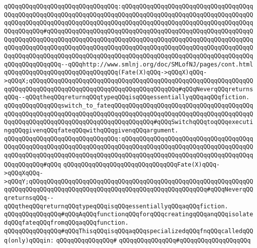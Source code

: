 \verb|qQQqqQQqqQQqqQQqqQQqqQQqqQQqqQQq:qQQqqQQqqQQqqQQqqQQqqQQqqQQqqQQqqQQqqQQqqQQqqQQqqQQqqQQqqQQqqQQqqQQqqQQqqQQqqQQqqQQqqQQqqQQqqQQqqQQqqQQqqQQqqQQqqQQqqQQqqQQqqQQqqQQqqQQqqQQqqQQqqQQqqQQqqQQqqQQqqQQqqQQqqQQqqQQqqQQqqQQqqQQq#qQQqqQQqqQQqqQQqqQQqqQQqqQQqqQQqqQQqqQQqqQQqqQQqqQQqqQQqqQQqqQQqqQQqqQQqqQQqqQQqqQQqqQQqqQQqqQQqqQQqqQQqqQQqqQQqqQQqqQQqqQQqqQQqqQQqqQQqqQQqqQQqqQQqqQQqqQQqqQQqqQQqqQQqqQQqqQQqqQQqqQQqqQQqqQQqqQQqqQQqqQQqqQQqqQQqqQQqqQQqqQQqqQQqqQQqqQQqqQQqqQQqqQQqqQQqqQQqqQQqqQQqqQQqqQQqqQQqqQQqqQQq--qQQqhttp://www.smlnj.org/doc/SMLofNJ/pages/cont.html|\newline
\verb|qQQqqQQqqQQqqQQqqQQqqQQqqQQqqQQq(Fate(X)qQQq->qQQqX)qQQq->qQQqX;qQQqqQQqqQQqqQQqqQQqqQQqqQQqqQQqqQQqqQQqqQQqqQQqqQQqqQQqqQQqqQQqqQQqqQQqqQQqqQQqqQQqqQQqqQQqqQQqqQQqqQQqqQQqqQQq#qQQqNeverqQQqreturnsqQQq--qQQqtheqQQqreturnqQQqtypeqQQqisqQQqessentiallyqQQqaqQQqfiction.|\newline
\newline
\verb|qQQqqQQqqQQqqQQqswitch_to_fateqQQqqQQqqQQqqQQqqQQqqQQqqQQqqQQqqQQqqQQqqQQqqQQqqQQqqQQqqQQqqQQqqQQqqQQqqQQqqQQqqQQqqQQqqQQqqQQqqQQqqQQqqQQqqQQqqQQqqQQqqQQqqQQqqQQqqQQqqQQqqQQqqQQqqQQq#qQQqSwitchqQQqtoqQQqexecutingqQQqgivenqQQqfateqQQqwithqQQqgivenqQQqargument.|\newline
\verb|qQQqqQQqqQQqqQQqqQQqqQQqqQQqqQQq:qQQqqQQqqQQqqQQqqQQqqQQqqQQqqQQqqQQqqQQqqQQqqQQqqQQqqQQqqQQqqQQqqQQqqQQqqQQqqQQqqQQqqQQqqQQqqQQqqQQqqQQqqQQqqQQqqQQqqQQqqQQqqQQqqQQqqQQqqQQqqQQqqQQqqQQqqQQqqQQqqQQqqQQqqQQqqQQqqQQqqQQqqQQq#qQQq|\newline
\verb|qQQqqQQqqQQqqQQqqQQqqQQqqQQqqQQqFate(X)qQQq->qQQqXqQQq->qQQqY;qQQqqQQqqQQqqQQqqQQqqQQqqQQqqQQqqQQqqQQqqQQqqQQqqQQqqQQqqQQqqQQqqQQqqQQqqQQqqQQqqQQqqQQqqQQqqQQqqQQqqQQqqQQqqQQqqQQqqQQq#qQQqNeverqQQqreturnsqQQq--qQQqtheqQQqreturnqQQqtypeqQQqisqQQqessentiallyqQQqaqQQqfiction.|\newline
\newline
\newline
\newline
\verb|qQQqqQQqqQQqqQQq#qQQqAqQQqfunctionqQQqforqQQqcreatingqQQqanqQQqisolatedqQQqfateqQQqfromqQQqaqQQqfunction.|\newline
\verb|qQQqqQQqqQQqqQQq#qQQqThisqQQqisqQQqaqQQqspecializedqQQqfnqQQqcalledqQQq(only)qQQqin:|\newline
\verb|qQQqqQQqqQQqqQQq#|\newline
\verb|qQQqqQQqqQQqqQQq#qQQqqQQqqQQqqQQqqQQq|\newline
